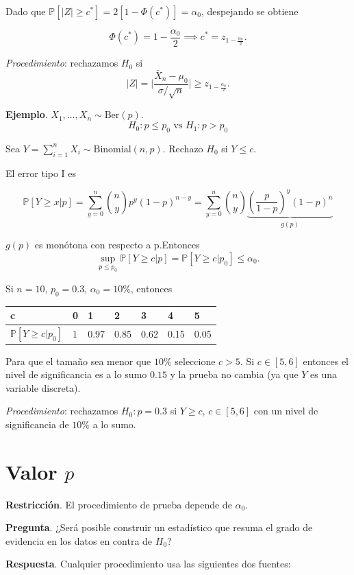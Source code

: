 \documentclass[
  12pt,
]{book}
\begin{document}
Dado que \(\mathbb P[|Z|\geq c^*] = 2[1-\Phi(c^*)] = \alpha_0\), despejando se obtiene

\[\Phi(c^*) = 1 - \dfrac{\alpha_0}2 \implies c^* = z_{1-\frac{\alpha_0}2}.\]

\emph{Procedimiento}: rechazamos \(H_0\) si
\[|Z| = \bigg| \dfrac{\bar X_n-\mu_0}{\sigma/\sqrt n}\bigg| \geq z_{1-\frac{\alpha_0}2}.\]

\textbf{Ejemplo}. \(X_1,\dots,X_n \sim \text{Ber}(p)\).
\[H_0: p\leq p_0 \text{ vs } H_1: p>p_0\]

Sea \(Y = \sum_{i=1}^nX_i \sim \text{Binomial}(n,p)\). Rechazo \(H_0\) si \(Y\leq c\).

El error tipo I es

\[\mathbb P[Y\geq x|p] = \sum_{y=0}^n{n\choose y}p^y(1-p)^{n-y} = \sum_{y=0}^n{n\choose y} \underbrace{\left(\dfrac p{1-p}\right)^y(1-p)^n}_{g(p)}\]

\(g(p)\) es monótona con respecto a p.Entonces
\[\sup_{p\leq p_0} \mathbb P[Y\geq c|p] = \mathbb P [Y\geq c|p_0] \leq \alpha_0.\]

Si \(n=10\), \(p_0 = 0.3\), \(\alpha_0 = 10\%\), entonces

\begin{longtable}[]{@{}lllllll@{}}
\toprule
c & 0 & 1 & 2 & 3 & 4 & 5\tabularnewline
\midrule
\endhead
\(\mathbb P[Y\geq c|p_0]\) & 1 & 0.97 & 0.85 & 0.62 & 0.15 & 0.05\tabularnewline
\bottomrule
\end{longtable}

Para que el tamaño sea menor que \(10\%\) seleccione \(c>5\). Si \(c\in [5,6]\) entonces el nivel de significancia es a lo sumo \(0.15\) y la prueba no cambia (ya que \(Y\) es una variable discreta).

\emph{Procedimiento}: rechazamos \(H_0: p = 0.3\) si \(Y\geq c\), \(c\in[5,6]\) con un nivel de significancia de \(10\%\) a lo sumo.

\hypertarget{valor-p}{%
\section{\texorpdfstring{Valor \(p\)}{Valor p}}\label{valor-p}}

\textbf{Restricción}. El procedimiento de prueba depende de \(\alpha_0\).

\textbf{Pregunta}. ¿Será posible construir un estadístico que resuma el grado de evidencia en los datos en contra de \(H_0\)?

\textbf{Respuesta}. Cualquier procedimiento usa las siguientes dos fuentes:
\end{document}
